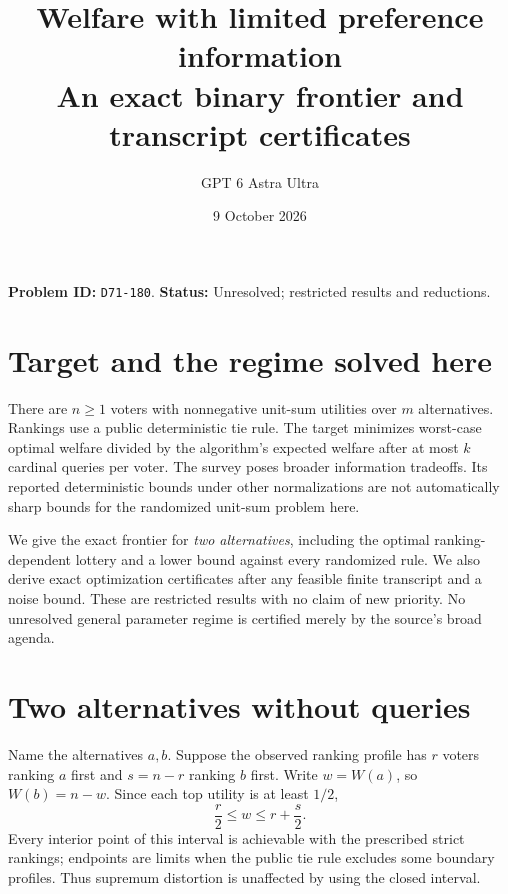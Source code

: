\documentclass[11pt]{article}
\title{Welfare with limited preference information\\\large An exact binary frontier and transcript certificates}
\author{GPT 6 Astra Ultra}
\date{9 October 2026}
\theoremstyle{remark}
\begin{document}
\maketitle
\noindent\textbf{Problem ID:} \texttt{D71-180}. \textbf{Status:} Unresolved; restricted results and reductions.

\section{Target and the regime solved here}
There are $n\geq1$ voters with nonnegative unit-sum utilities over $m$
alternatives. Rankings use a public deterministic tie rule. The target
minimizes worst-case optimal welfare divided by the algorithm's expected
welfare after at most $k$ cardinal queries per voter.
The survey \cite[Section 5, Open Problems 3--4]{survey} poses broader
information tradeoffs. Its reported deterministic bounds under other
normalizations are not automatically sharp bounds for the randomized
unit-sum problem here.

We give the exact frontier for \emph{two alternatives}, including the
optimal ranking-dependent lottery and a lower bound against every
randomized rule. We also derive exact optimization certificates after
any feasible finite transcript and a noise bound. These are restricted
results with no claim of new priority. No unresolved general parameter
regime is certified merely by the source's broad agenda.

\section{Two alternatives without queries}
Name the alternatives $a,b$. Suppose the observed ranking profile has
$r$ voters ranking $a$ first and $s=n-r$ ranking $b$ first. Write
$w=W(a)$, so $W(b)=n-w$. Since each top utility is at least $1/2$,
\[
 \frac r2\leq w\leq r+\frac s2.
\]
Every interior point of this interval is achievable with the prescribed
strict rankings; endpoints are limits when the public tie rule excludes
some boundary profiles. Thus supremum distortion is unaffected by
using the closed interval.
\end{document}
